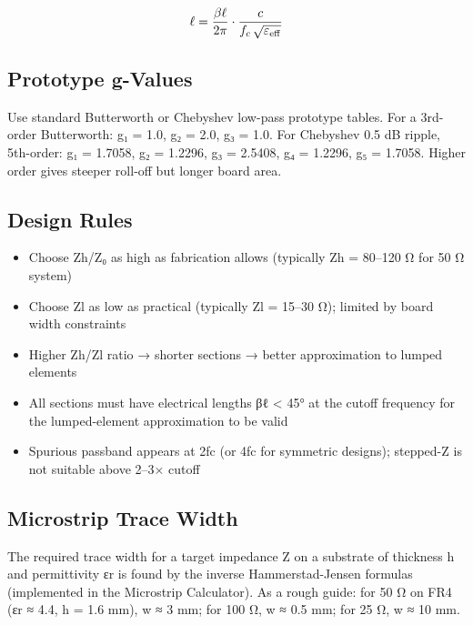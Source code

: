 				
\[\ell = \dfrac{\beta\ell}{2\pi}\cdot\dfrac{c}{f_c\,\sqrt{\varepsilon_{\rm eff}}}\]

				

\subsection{Prototype g-Values}

				

Use standard Butterworth or Chebyshev low-pass prototype tables. For a 3rd-order Butterworth: g₁ = 1.0, g₂ = 2.0, g₃ = 1.0. For Chebyshev 0.5 dB ripple, 5th-order: g₁ = 1.7058, g₂ = 1.2296, g₃ = 2.5408, g₄ = 1.2296, g₅ = 1.7058. Higher order gives steeper roll-off but longer board area.

				

\subsection{Design Rules}

				
\begin{itemize}

					\item Choose Zh/Z₀ as high as fabrication allows (typically Zh = 80–120 Ω for 50 Ω system)

					\item Choose Zl as low as practical (typically Zl = 15–30 Ω); limited by board width constraints

					\item Higher Zh/Zl ratio → shorter sections → better approximation to lumped elements

					\item All sections must have electrical lengths βℓ \textless{} 45° at the cutoff frequency for the lumped-element approximation to be valid

					\item Spurious passband appears at 2fc (or 4fc for symmetric designs); stepped-Z is not suitable above 2–3× cutoff

				
\end{itemize}

				

\subsection{Microstrip Trace Width}

				

The required trace width for a target impedance Z on a substrate of thickness h and permittivity εr is found by the inverse Hammerstad-Jensen formulas (implemented in the Microstrip Calculator). As a rough guide: for 50 Ω on FR4 (εr ≈ 4.4, h = 1.6 mm), w ≈ 3 mm; for 100 Ω, w ≈ 0.5 mm; for 25 Ω, w ≈ 10 mm.



